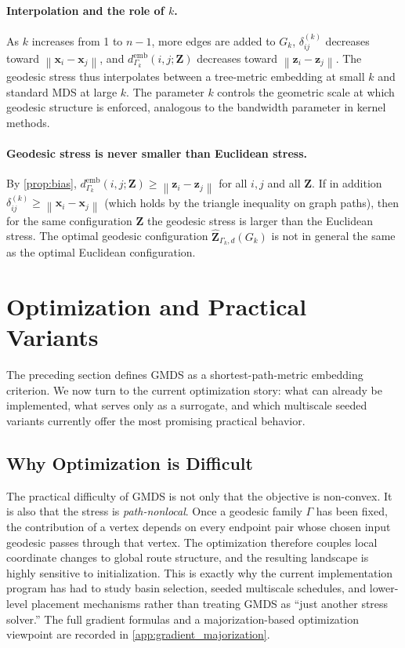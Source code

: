 \documentclass[twoside,11pt]{article}
\newcommand{\bx}{\mathbf{x}}
\newcommand{\bz}{\mathbf{z}}
\newcommand{\bZ}{\mathbf{Z}}
\newcommand{\norm}[1]{\left\|#1\right\|}
\newcommand{\demb}{d^{\mathrm{emb}}}
\newcommand{\Gk}{G_k}
\begin{document}
\paragraph{Interpolation and the role of $k$.}
As $k$ increases from 1 to $n-1$, more edges are added to $\Gk$,
$\delta^{(k)}_{ij}$ decreases toward $\norm{\bx_i - \bx_j}$, and
$\demb_{\Gamma_k}(i,j;\bZ)$ decreases toward $\norm{\bz_i - \bz_j}$.  The
geodesic stress thus interpolates between a tree-metric embedding at small
$k$ and standard MDS at large $k$.  The parameter $k$ controls the
geometric scale at which geodesic structure is enforced, analogous to the
bandwidth parameter in kernel methods.

\paragraph{Geodesic stress is never smaller than Euclidean stress.}
By \cref{prop:bias}, $\demb_{\Gamma_k}(i,j;\bZ) \geq \norm{\bz_i - \bz_j}$
for all $i,j$ and all $\bZ$.  If in addition $\delta^{(k)}_{ij} \geq
\norm{\bx_i - \bx_j}$ (which holds by the triangle inequality on graph
paths), then for the same configuration $\bZ$ the geodesic stress is
larger than the Euclidean stress.  The optimal geodesic configuration
$\hat{\bZ}_{\Gamma_k,d}(\Gk)$ is not in general the same as the optimal
Euclidean configuration.

\section{Optimization and Practical Variants}
\label{sec:optimization_v4}

The preceding section defines GMDS as a shortest-path-metric embedding
criterion.  We now turn to the current optimization story: what can already be
implemented, what serves only as a surrogate, and which multiscale seeded
variants currently offer the most promising practical behavior.

\subsection{Why Optimization is Difficult}
\label{sec:gradient}

The practical difficulty of GMDS is not only that the objective is non-convex.
It is also that the stress is \emph{path-nonlocal}.  Once a geodesic family
$\Gamma$ has been fixed, the contribution of a vertex depends on every endpoint
pair whose chosen input geodesic passes through that vertex.  The optimization
therefore couples local coordinate changes to global route structure, and the
resulting landscape is highly sensitive to initialization.  This is exactly why
the current implementation program has had to study basin selection, seeded
multiscale schedules, and lower-level placement mechanisms rather than treating
GMDS as ``just another stress solver.''  The full gradient formulas and a
majorization-based optimization viewpoint are recorded in
\cref{app:gradient_majorization}.
\end{document}
